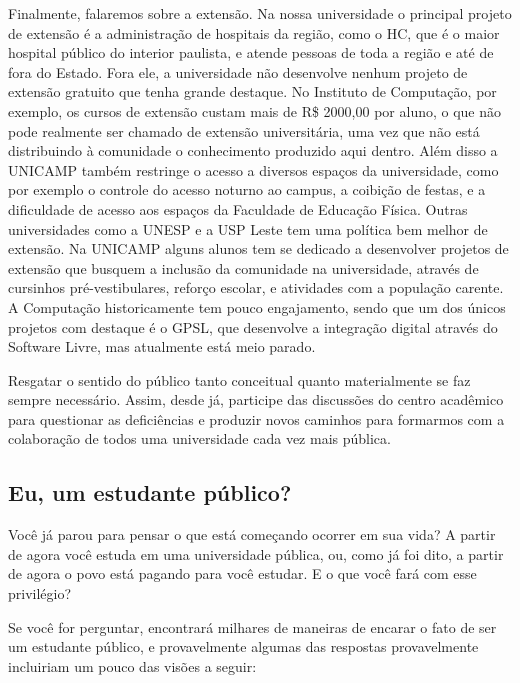 Finalmente, falaremos sobre a extensão. Na nossa universidade o principal
projeto de extensão é a administração de hospitais da região, como o HC, que
é o maior hospital público do interior paulista, e atende pessoas de toda
a região e até de fora do Estado. Fora ele, a universidade não desenvolve nenhum
projeto de extensão gratuito que tenha grande destaque. No Instituto de
Computação, por exemplo, os cursos de extensão custam mais de R\$ 2000,00 por
aluno, o que não pode realmente ser chamado de extensão universitária, uma vez
que não está distribuindo à comunidade o conhecimento produzido aqui dentro.
Além disso a UNICAMP também restringe o acesso a diversos espaços da
universidade, como por exemplo o controle do acesso noturno ao campus,
a coibição de festas, e a dificuldade de acesso aos espaços da Faculdade de
Educação Física. Outras universidades como a UNESP e a USP Leste tem uma
política bem melhor de extensão. Na UNICAMP alguns alunos tem se dedicado
a desenvolver projetos de extensão que busquem a inclusão da comunidade na
universidade, através de cursinhos pré-vestibulares, reforço escolar,
e atividades com a população carente. A Computação historicamente tem pouco
engajamento, sendo que um dos únicos projetos com destaque é o GPSL, que
desenvolve a integração digital através do Software Livre, mas atualmente está
meio parado.

Resgatar o sentido do público tanto conceitual quanto materialmente se faz
sempre necessário. Assim, desde já, participe das discussões do centro acadêmico
para questionar as deficiências e produzir novos caminhos para formarmos com
a colaboração de todos uma universidade cada vez mais pública.

\subsection{Eu, um estudante público?}

Você já parou para pensar o que está começando ocorrer em sua vida? A partir de
agora você estuda em uma universidade pública, ou, como já foi dito, a partir de
agora o povo está pagando para você estudar. E o que você fará com esse
privilégio?

Se você for perguntar, encontrará milhares de maneiras de encarar o fato de ser
um estudante público, e provavelmente algumas das respostas provavelmente
incluiriam um pouco das visões a seguir:

